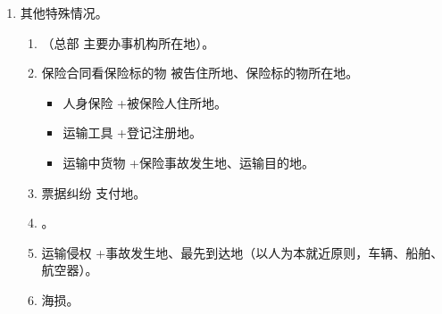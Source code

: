 \begin{enumerate}
\begin{enumerate}
\begin{enumerate}
                        \begin{kk}{实际履行地的确定}
                          \begin{enumerate}
                            \item 给付货币 \yjt 接收货币方为合同履行地。容易忽略！！
                            \item {}。。
                            \item 财产、融资租赁 \yjt 租赁物使用地。
                            \item 信息网络/其他方式交付标的 \yjt 买受人住所地/收货地。。
                            \item 其他标的 \yjt 履行义务方住所地。\sjt 结合合同性质看原告诉讼请求。
                          \end{enumerate}
                          \tcblower
                          合同管辖做题。专属管辖 \yjt 协议管辖 \yjt 合同纠纷法定管辖 \yjt 被告住所地 + 合同履行地。
                        \end{kk}
                  \item 其他特殊情况。
                        \begin{enumerate}
                          \item {}（总部 \hz 主要办事机构所在地）。
                          \item 保险合同看保险标的物 \yjt 被告住所地、保险标的物所在地。
                                \begin{itemize}
                                  \item 人身保险 \yjt +被保险人住所地。
                                  \item 运输工具 \yjt +登记注册地。
                                  \item 运输中货物 \yjt +保险事故发生地、运输目的地。
                                \end{itemize}
                          \item 票据纠纷 \yjt 支付地。
                          \item {}。
                          \item 运输侵权 \yjt +事故发生地、最先到达地（以人为本就近原则，车辆、船舶、航空器）。
                          \item 海损。
                        \end{enumerate}
                \end{enumerate}

\end{enumerate}
\end{enumerate}
